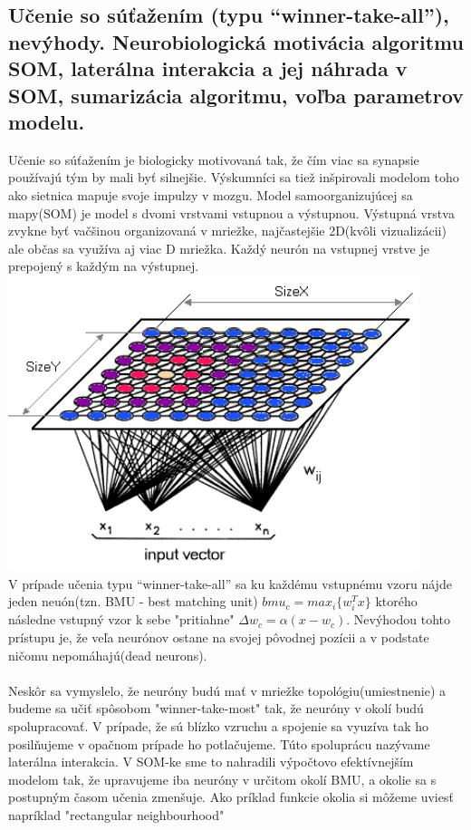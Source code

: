 \documentclass{article}
\numberwithin{equation}{section} %
\begin{document}
\subsection{Učenie so súťažením (typu “winner-take-all”), nevýhody. Neurobiologická motivácia algoritmu SOM, laterálna interakcia a jej náhrada v SOM, sumarizácia algoritmu, voľba parametrov modelu.}
Učenie so súťažením je biologicky motivovaná tak, že čím viac sa synapsie používajú tým by mali byť silnejšie. Výskumníci sa tiež inšpirovali modelom toho ako sietnica mapuje svoje impulzy v mozgu. Model samoorganizujúcej sa mapy(SOM) je model s dvomi vrstvami vstupnou a výstupnou. Výstupná vrstva zvykne byť vačšinou organizovaná v mriežke, najčastejšie 2D(kvôli vizualizácii) ale občas sa využíva aj viac D mriežka. Každý neurón na vstupnej vrstve je prepojený s každým na výstupnej. \\
\includegraphics[width=12cm]{imgs/som}\\
V prípade učenia typu “winner-take-all” sa ku každému vstupnému vzoru nájde jeden neuón(tzn. BMU - best matching unit) $bmu_c = max_i\{w_i^Tx\}$ ktorého následne vstupný vzor k sebe "pritiahne" $\Delta w_c = \alpha (x - w_c)$. Nevýhodou tohto prístupu je, že veľa neurónov ostane na svojej pôvodnej pozícii a v podstate ničomu nepomáhajú(dead neurons).\\\\
Neskôr sa vymyslelo, že neuróny budú mať v mriežke topológiu(umiestnenie) a budeme sa učiť spôsobom "winner-take-most" tak, že neuróny v okolí budú spolupracovať. V prípade, že sú blízko vzruchu a spojenie sa vyuzíva tak ho posilňujeme v opačnom prípade ho potlačujeme. Túto spoluprácu nazývame laterálna interakcia. V SOM-ke sme to nahradili výpočtovo efektívnejším modelom tak, že upravujeme iba neuróny v určitom okolí BMU, a okolie sa s postupným časom učenia zmenšuje. Ako príklad funkcie okolia si môžeme uviesť napríklad "rectangular neighbourhood"\\
\end{document}
